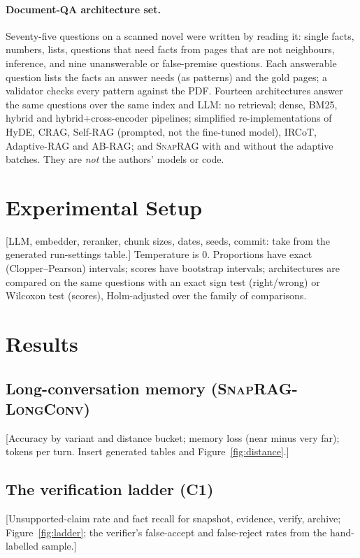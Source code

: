 \documentclass[10pt,twocolumn]{article}
\newcommand{\todo}[1]{{\color{red}[#1]}}      %
\newcommand{\sys}{\textsc{SnapRAG}}
\newcommand{\bench}{\textsc{SnapRAG-LongConv}}
\begin{document}
\paragraph{Document-QA architecture set.}\label{sec:docqa}
Seventy-five questions on a scanned novel were written by reading it: single facts, numbers, lists, questions that need facts from pages that are not neighbours, inference, and nine unanswerable or false-premise questions. Each answerable question lists the facts an answer needs (as patterns) and the gold pages; a validator checks every pattern against the PDF. Fourteen architectures answer the same questions over the same index and LLM: no retrieval; dense, BM25, hybrid and hybrid+cross-encoder pipelines; simplified re-implementations of HyDE, CRAG, Self-RAG (prompted, not the fine-tuned model), IRCoT, Adaptive-RAG and AB-RAG; and \sys{} with and without the adaptive batches. They are \emph{not} the authors' models or code.

\section{Experimental Setup}
\todo{LLM, embedder, reranker, chunk sizes, dates, seeds, commit: take from the generated run-settings table.} Temperature is 0. Proportions have exact (Clopper--Pearson) intervals; scores have bootstrap intervals; architectures are compared on the same questions with an exact sign test (right/wrong) or Wilcoxon test (scores), Holm-adjusted over the family of comparisons.

\section{Results}\label{sec:results}
\subsection{Long-conversation memory (\bench{})}
\todo{Accuracy by variant and distance bucket; memory loss (near minus very far); tokens per turn. Insert generated tables and Figure~\ref{fig:distance}.}

\subsection{The verification ladder (C1)}
\todo{Unsupported-claim rate and fact recall for snapshot, evidence, verify, archive; Figure~\ref{fig:ladder}; the verifier's false-accept and false-reject rates from the hand-labelled sample.}
\end{document}
